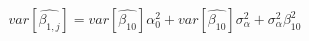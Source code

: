 \begin{equation}
var[\hat{\beta_{1,j}}] = var[\hat{\beta_{10}}]\alpha_0^2 + var[\hat{\beta_{10}}]\sigma_{\alpha}^2 + \sigma_{\alpha}^2\beta_{10}^2
\end{equation}